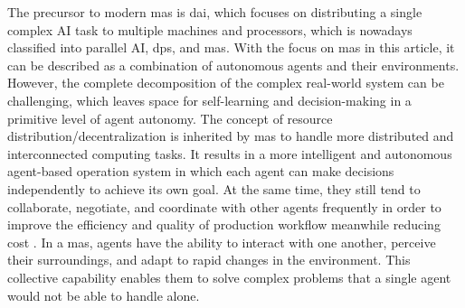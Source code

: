 The precursor to modern \gls{mas} is \gls{dai}, which focuses on distributing a 
single complex AI task to multiple machines and processors\cite{noauthor_jacques_nodate}, 
which is nowadays classified into parallel AI, \gls{dps}, and \gls{mas}\cite{dorri_multi-agent_2018}. 
With the focus on \gls{mas} in this article, it can be described as a combination of 
autonomous agents and their environments. However, the complete decomposition of 
the complex real-world system can be challenging, which leaves space for self-learning 
and decision-making in a primitive level of agent autonomy\cite{reis_applications_2004}. 
The concept of resource distribution/decentralization is inherited by \gls{mas} to 
handle more distributed and interconnected computing tasks. It results in a more 
intelligent and autonomous agent-based operation system in which each agent can make 
decisions independently to achieve its own goal. At the same time, they still tend 
to collaborate, negotiate, and coordinate with other agents frequently in order to 
improve the efficiency and quality of production workflow meanwhile reducing 
cost \cite{vogel-heuser_multi-agent_2020}. In a \gls{mas}, agents have the ability 
to interact with one another, perceive their surroundings, and adapt to rapid changes 
in the environment. This collective capability enables them to solve complex problems 
that a single agent would not be able to handle alone. 


